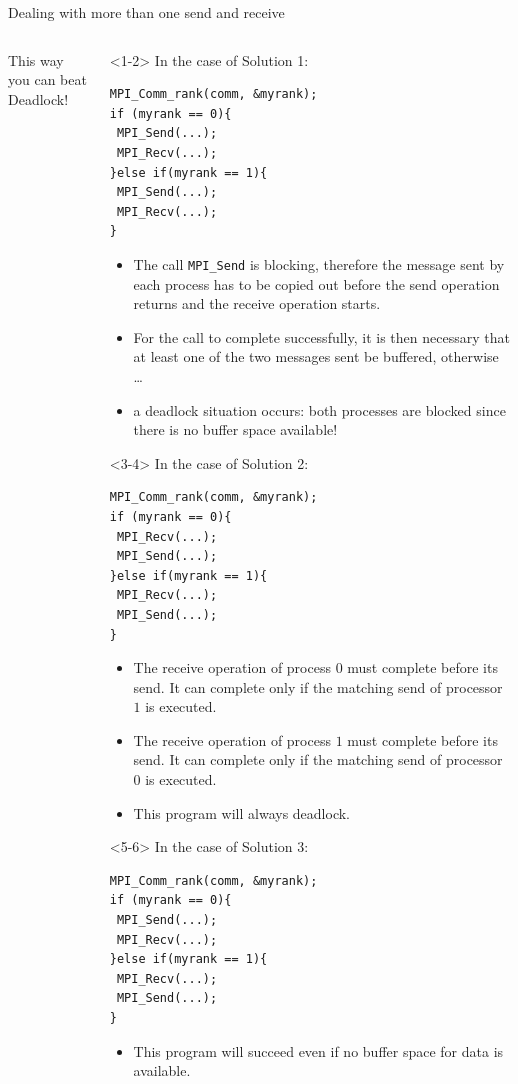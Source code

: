 \documentclass[xcolor={svgnames,usenames}]{beamer}
\begin{document}
\begin{frame}[fragile]{Dealing with more than one send and receive}
\begin{columns}
\begin{column}{0.30\columnwidth}
{This way you can beat Deadlock!
}
\end{column}
\begin{column}{0.70\columnwidth}
\begin{onlyenv}<1-2>
\noindent In the case of Solution 1:
{\footnotesize
\begin{verbatim}
MPI_Comm_rank(comm, &myrank);
if (myrank == 0){
 MPI_Send(...);
 MPI_Recv(...);
}else if(myrank == 1){
 MPI_Send(...); 
 MPI_Recv(...);
}
\end{verbatim}
}
\begin{itemize}
	\item The call \texttt{MPI_Send} is blocking, therefore the message sent by each process has to be copied out before the send operation returns
	and the receive operation starts.
	\item For the call to complete successfully, it is then necessary that \alert{at least one of the two messages sent be buffered}, otherwise \ldots
	\item a deadlock situation occurs: both processes are blocked since there is no buffer space available!
\end{itemize}
\end{onlyenv}
\begin{onlyenv}<3-4>
\noindent In the case of Solution 2:
{\footnotesize
\begin{verbatim}
MPI_Comm_rank(comm, &myrank);
if (myrank == 0){
 MPI_Recv(...);
 MPI_Send(...);
}else if(myrank == 1){
 MPI_Recv(...);
 MPI_Send(...); 
}
\end{verbatim}
}
\begin{itemize}
	\item The receive operation of process $0$ must complete before its send. It can complete
	\alert{only if} the matching send of processor $1$ is executed.
	\item The receive operation of process $1$ must complete before its send. It can complete
	\alert{only if} the matching send of processor $0$ is executed.
	\item This program will always deadlock.
\end{itemize}
\end{onlyenv}
\begin{onlyenv}<5-6>
\noindent In the case of Solution 3:
{\footnotesize
\begin{verbatim}
MPI_Comm_rank(comm, &myrank);
if (myrank == 0){
 MPI_Send(...);
 MPI_Recv(...);
}else if(myrank == 1){
 MPI_Recv(...);
 MPI_Send(...); 
}
\end{verbatim}
}
\begin{itemize}
	\item This program will succeed even if no buffer space for data is available.
\end{itemize}
\end{onlyenv}
\end{column}
\end{columns}	
\end{frame}
\end{document}

